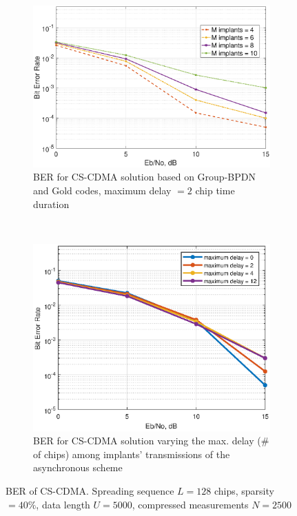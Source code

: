 \begin{figure}[h!]
\centering
    \begin{subfigure}[b]{0.95\textwidth}
    	\includegraphics[width=\textwidth]{figures/GC_beamforming/ber_sensors_sp-40-delay_2.eps}
    	\caption{BER for CS-CDMA solution based on Group-BPDN and Gold codes, maximum delay $= 2$ chip time duration}
    	\label{Fig_result1}
    \end{subfigure}
    ~
    \begin{subfigure}[b]{0.95\textwidth}
	    \includegraphics[width=\textwidth]{figures/GC_beamforming/delay_sp-40-sen-8.eps}
	    \caption{BER for CS-CDMA solution varying the max. delay (\# of chips) among implants' transmissions of the asynchronous scheme}
    	\label{Fig_result1bis}
    \end{subfigure}
    \caption{BER of CS-CDMA. Spreading sequence $L = 128$ chips, sparsity $= 40 \%$, data length $U = 5000$, compressed measurements $N = 2500$}
    \label{F:CSCDMABER}
    \vspace{-3mm}
\end{figure} 
  
